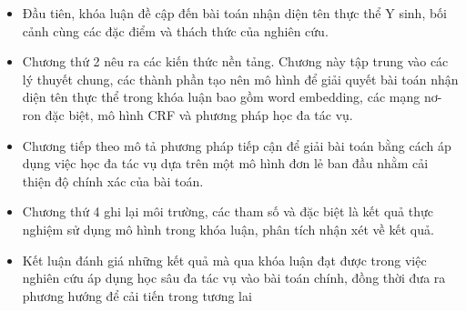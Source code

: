 \documentclass[../main.tex]{subfiles}
\begin{document}
\begin{itemize}

\item Đầu tiên, khóa luận đề cập đến bài toán nhận diện tên thực thể Y sinh, bối cảnh cùng các đặc điểm và thách thức của nghiên cứu.

\item Chương thứ 2 nêu ra các kiến thức nền tảng. Chương này tập trung vào các lý thuyết chung, các thành phần tạo nên mô hình để giải quyết bài toán nhận diện tên thực thể trong khóa luận bao gồm word embedding, các mạng nơ-ron đặc biệt, mô hình CRF và phương pháp học đa tác vụ. 

\item Chương tiếp theo mô tả phương pháp tiếp cận để giải bài toán bằng cách áp dụng việc học đa tác vụ dựa trên một mô hình đơn lẻ ban đầu nhằm cải thiện độ chính xác của bài toán. 

\item Chương thứ 4 ghi lại môi trường, các tham số và đặc biệt là kết quả thực nghiệm sử dụng mô hình trong khóa luận, phân tích nhận xét về kết quả. 

\item Kết luận đánh giá những kết quả mà qua khóa luận đạt được trong việc nghiên cứu áp dụng học sâu đa tác vụ vào bài toán chính, đồng thời đưa ra phương hướng để cải tiến trong tương lai

\end{itemize}
\end{document}
